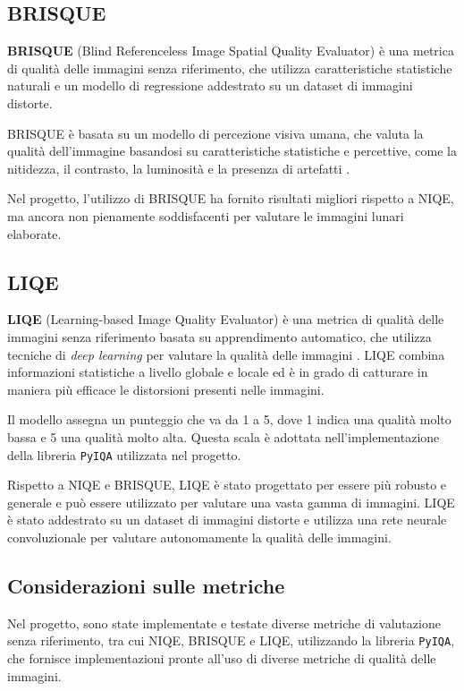 \subsection{BRISQUE} \label{subsec:brisque}

\textbf{BRISQUE} (Blind Referenceless Image Spatial Quality Evaluator) è una metrica di qualità delle immagini senza riferimento, che utilizza caratteristiche statistiche naturali e un modello di regressione addestrato su un dataset di immagini distorte.

BRISQUE è basata su un modello di percezione visiva umana, che valuta la qualità dell'immagine basandosi su caratteristiche statistiche e percettive, come la nitidezza, il contrasto, la luminosità e la presenza di artefatti \cite{brisque_paper}.

Nel progetto, l'utilizzo di BRISQUE ha fornito risultati migliori rispetto a NIQE, ma ancora non pienamente soddisfacenti per valutare le immagini lunari elaborate.

\subsection{LIQE} \label{subsec:liqe}

\textbf{LIQE} (Learning-based Image Quality Evaluator) è una metrica di qualità delle immagini senza riferimento basata su apprendimento automatico, che utilizza tecniche di \textit{deep learning} per valutare la qualità delle immagini \cite{liqe_paper}. LIQE combina informazioni statistiche a livello globale e locale ed è in grado di catturare in maniera più efficace le distorsioni presenti nelle immagini.

Il modello assegna un punteggio che va da 1 a 5, dove 1 indica una qualità molto bassa e 5 una qualità molto alta. Questa scala è adottata nell'implementazione della libreria \texttt{PyIQA} utilizzata nel progetto.

Rispetto a NIQE e BRISQUE, LIQE è stato progettato per essere più robusto e generale e può essere utilizzato per valutare una vasta gamma di immagini. LIQE è stato addestrato su un dataset di immagini distorte e utilizza una rete neurale convoluzionale per valutare autonomamente la qualità delle immagini.

\subsection{Considerazioni sulle metriche} \label{subsec:why_liqe}

Nel progetto, sono state implementate e testate diverse metriche di valutazione senza riferimento, tra cui NIQE, BRISQUE e LIQE, utilizzando la libreria \texttt{PyIQA}, che fornisce implementazioni pronte all'uso di diverse metriche di qualità delle immagini.

